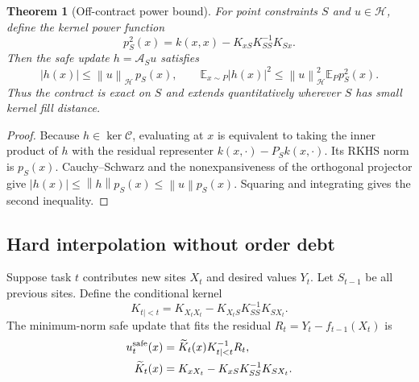 \documentclass{vanish_ieee}
\newtheorem{theorem}{Theorem}
\theoremstyle{definition}
\newcommand{\Hcal}{\mathcal{H}}
\newcommand{\Aop}{\mathcal{A}}
\newcommand{\Cop}{\mathcal{C}}
\newcommand{\norm}[1]{\left\lVert#1\right\rVert}
\begin{document}
\begin{theorem}[Off-contract power bound]
For point constraints $S$ and $u\in\Hcal$, define the kernel power function
\begin{equation}
p_S^2(x)=k(x,x)-K_{xS}K_{SS}^{-1}K_{Sx}.
\end{equation}
Then the safe update $h=\Aop_Su$ satisfies
\begin{equation}
|h(x)|\leq \norm{u}_{\Hcal}\,p_S(x),\qquad
\mathbb{E}_{x\sim P}|h(x)|^2\leq \norm{u}_{\Hcal}^2\mathbb{E}_{P}p_S^2(x).
\label{eq:power-bound}
\end{equation}
Thus the contract is exact on $S$ and extends quantitatively wherever $S$ has small kernel fill distance.
\label{thm:power}
\end{theorem}
\begin{proof}
Because $h\in\ker\Cop$, evaluating at $x$ is equivalent to taking the inner product of $h$ with the residual representer $k(x,\cdot)-P_Sk(x,\cdot)$.  Its RKHS norm is $p_S(x)$.  Cauchy--Schwarz and the nonexpansiveness of the orthogonal projector give $|h(x)|\leq\norm{h}p_S(x)\leq\norm{u}p_S(x)$.  Squaring and integrating gives the second inequality.
\end{proof}

\subsection{Hard interpolation without order debt}

Suppose task $t$ contributes new sites $X_t$ and desired values $Y_t$.  Let $S_{t-1}$ be all previous sites.  Define the conditional kernel
\begin{equation}
K_{t\mid<t}=K_{X_tX_t}-K_{X_tS}K_{SS}^{-1}K_{SX_t}.
\label{eq:schur}
\end{equation}
The minimum-norm safe update that fits the residual $R_t=Y_t-f_{t-1}(X_t)$ is
\begin{align}
u_t^{\rm safe}(x)&=\widetilde K_t(x)K_{t\mid<t}^{-1}R_t,\\
\widetilde K_t(x)&=K_{xX_t}-K_{xS}K_{SS}^{-1}K_{SX_t}.
\label{eq:conditional-update}
\end{align}
\end{document}
